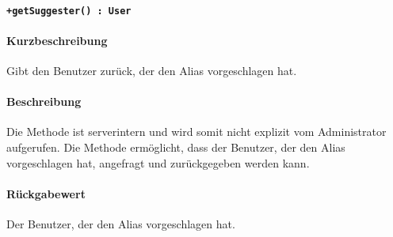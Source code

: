 \paragraph*{\texttt{+getSuggester() : User}}%
\paragraph*{Kurzbeschreibung}
Gibt den Benutzer zurück, der den Alias vorgeschlagen hat.
\paragraph*{Beschreibung}
Die Methode ist serverintern und wird somit nicht explizit vom Administrator aufgerufen.
Die Methode ermöglicht, dass der Benutzer, der den Alias vorgeschlagen hat, angefragt und zurückgegeben werden kann.
\paragraph*{Rückgabewert}
Der Benutzer, der den Alias vorgeschlagen hat.
